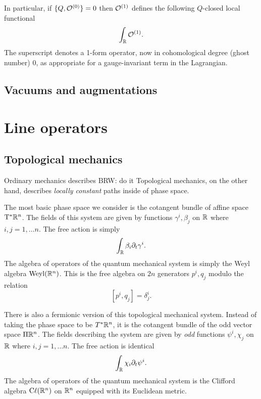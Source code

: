 \documentclass[11pt]{amsart}
\def\Weyl{{\rm Weyl}}
\def\Cl{{\rm C}\ell}
\def\brian#1{{\textcolor{blue!65!red}{BRW: {#1}}}}
\begin{document}
In particular, if $\{Q,\mathcal O^{(0)}\} = 0$ then $\mathcal O^{(1)}$ defines the following $Q$-closed local functional
\[
\int_{\mathbb R} \mathcal O^{(1)} .
\]
The superscript denotes a 1-form operator, now in cohomological degree (ghost number) 0, as appropriate for a gauge-invariant term in the Lagrangian. 


\subsection{Vacuums and augmentations}


\section{Line operators}


\subsection*{Topological mechanics}


Ordinary mechanics describes \brian{do it}
Topological mechanics, on the other hand, describes {\em locally constant} paths inside of phase space.

The most basic phase space we consider is the cotangent bundle of affine space ${\rm T}^* \mathbb R^n$.
The fields of this system are given by functions $\gamma^i, \beta_j$ on $\mathbb R$ where $i,j=1,\ldots n$. 
The free action is simply
\[
\int_\mathbb R \beta_i \partial_t \gamma^i .
\]
The algebra of operators of the quantum mechanical system is simply the Weyl algebra $\Weyl(\RR^n)$.
This is the free algebra on $2n$ generators $p^i, q_j$ modulo the relation
\[
[p^i, q_j] = \delta^i_j .
\]

There is also a fermionic version of this topological mechanical system. 
Instead of taking the phase space to be $T^* \mathbb R^n$, it is the cotangent bundle of the odd vector space $\Pi \mathbb R^n$.
The fields describing the system are given by {\em odd} functions $\psi^i, \chi_j$ on $\mathbb R$ where $i,j=1,\ldots n$. 
The free action is identical
\[
\int_\mathbb R \chi_i \partial_t \psi^i .
\]
The algebra of operators of the quantum mechanical system is the Clifford algebra $\Cl(\RR^n)$ on $\mathbb R^n$ equipped with its Euclidean metric. 
\end{document}

